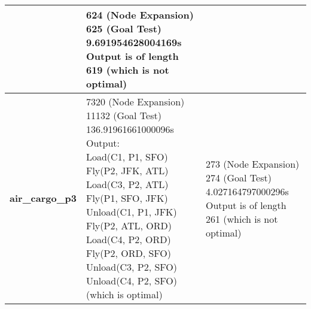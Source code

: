 \documentclass{article}
\begin{document}
\begin{center}
\begin{tabular}{ | l | p{6cm} | p{6cm} | }
{      }
      &
      \parbox[t]{6cm}{624 (Node Expansion)\\625 (Goal Test)\\9.691954628004169s \\}
      Output is of length 619 (which is not optimal)
       \\ \hline
      \textbf{air\_cargo\_p3}
      &
      \parbox[t]{6cm}{7320 (Node Expansion)\\11132 (Goal Test)\\136.91961661000096s \\}
      \parbox[t]{6cm}{
      Output:\\
        Load(C1, P1, SFO)\\
        Fly(P2, JFK, ATL)\\
        Load(C3, P2, ATL)\\
        Fly(P1, SFO, JFK)\\
        Unload(C1, P1, JFK)\\
        Fly(P2, ATL, ORD)\\
        Load(C4, P2, ORD)\\
        Fly(P2, ORD, SFO)\\
        Unload(C3, P2, SFO)\\
        Unload(C4, P2, SFO)\\
        (which is optimal)\\
        }
      &
      \parbox[t]{6cm}{273 (Node Expansion)\\274 (Goal Test)\\4.027164797000296s \\}
      Output is of length 261 (which is not optimal)
      \\
      \hline
    \end{tabular}


  \end{center}
\end{document}
